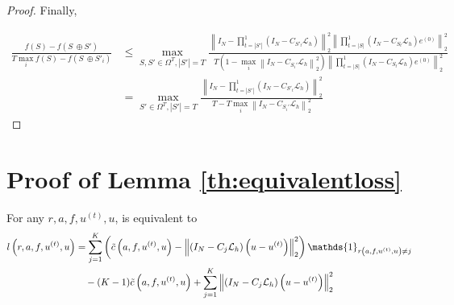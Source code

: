 \documentclass[12pt]{article}
\begin{document}
\begin{proof}
Finally,

\begin{align*}
    \frac{f(S) - f(S\ \oplus S')}{T\max_i f(S) - f(S\ \oplus S'_i)} &\leq \max_{S, S' \in \Omega^T, |S'| = T}\frac{ \left \| I_N-\prod_{t = |S'|}^{1}\left(I_N - C_{S'_t}\mathcal{L}_h\right) \right\|^2_2\left\| \prod_{t = |S|}^1\left(I_N - C_{S_t}\mathcal{L}_h\right) e^{(0)}\right\|^2_2}{T\left(1 - \max_i \left \|I_N - C_{S_i'}\mathcal{L}_h\right\|^2_2\right) \left \|\prod_{t = |S|}^1\left(I_N - C_{S_t}\mathcal{L}_h\right) e^{(0)}\right\|^2_2 } \\
    &= \max_{S' \in \Omega^T, |S'| = T}\frac{\left \| I_N-\prod_{t = |S'|}^{1}\left(I_N - C_{S'_t}\mathcal{L}_h\right) \right\|^2_2}{T - T\max_i \left \|I_N - C_{S_i'}\mathcal{L}_h\right\|^2_2}
\end{align*}
\end{proof}

\section{Proof of Lemma \ref{th:equivalentloss}}

\begin{lemma} \label{th:equivalentloss}
    For any $r, a, f, u^{(t)}, u$,  is equivalent to
    \begin{align*}
        l\left(r, a, f, u^{(t)}, u\right) &= \sum_{j = 1}^K \left(\Tilde{c}\left(a, f, u^{(t)}, u\right) -\left\|\left( I_N - C_{j} \mathcal{L}_{h}\right)\left(u - u^{(t)}\right)\right\|^2_2\right)\mathds{1}_{r\left(a, f, u^{(t)}, u\right) \neq j} \\
        &\quad - (K - 1)\Tilde{c}\left(a, f, u^{(t)}, u\right) + \sum_{j = 1}^K  \left\|\left( I_N - C_{j} \mathcal{L}_{h}\right)\left(u - u^{(t)}\right)\right\|^2_2
    \end{align*}
\end{lemma}
\end{document}
